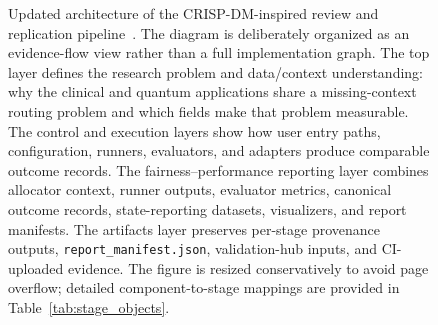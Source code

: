 \documentclass{IEEEtran}
\begin{document}
\clearpage
\begin{landscape}
\thispagestyle{plain}
\begin{figure}[p]
\centering
\resizebox{0.90\linewidth}{!}{}
\caption{Updated architecture of the CRISP-DM-inspired review and replication pipeline~\cite{wirth2000crisp}. The diagram is deliberately organized as an evidence-flow view rather than a full implementation graph. The top layer defines the research problem and data/context understanding: why the clinical and quantum applications share a missing-context routing problem and which fields make that problem measurable. The control and execution layers show how user entry paths, configuration, runners, evaluators, and adapters produce comparable outcome records. The fairness--performance reporting layer combines allocator context, runner outputs, evaluator metrics, canonical outcome records, state-reporting datasets, visualizers, and report manifests. The artifacts layer preserves per-stage provenance outputs, \texttt{report\_manifest.json}, validation-hub inputs, and CI-uploaded evidence. The figure is resized conservatively to avoid page overflow; detailed component-to-stage mappings are provided in Table~\ref{tab:stage_objects}.}
\label{fig:architecture_draft2}
\end{figure}
\end{landscape}
\end{document}
